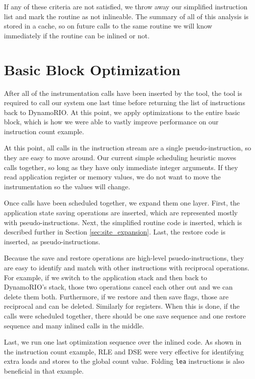 If any of these criteria are not satisfied, we throw away our simplified
instruction list and mark the routine as not inlineable.  The summary of all of
this analysis is stored in a cache, so on future calls to the same routine we
will know immediately if the routine can be inlined or not.

\section{Basic Block Optimization}

After all of the instrumentation calls have been inserted by the tool, the tool
is required to call our system one last time before returning the list of
instructions back to DynamoRIO.  At this point, we apply optimizations to the
entire basic block, which is how we were able to vastly improve performance on
our instruction count example.

At this point, all calls in the instruction stream are a single
pseudo-instruction, so they are easy to move around.  Our current simple
scheduling heuristic moves calls together, so long as they have only immediate
integer arguments.  If they read application register or memory values, we do
not want to move the instrumentation so the values will change.

Once calls have been scheduled together, we expand them one layer.  First, the
application state saving operations are inserted, which are represented mostly
with pseudo-instructions.  Next, the simplified routine code is inserted, which
is described further in Section \ref{sec:site_expansion}.  Last, the restore
code is inserted, as pseudo-instructions.

Because the save and restore operations are high-level psuedo-instructions, they
are easy to identify and match with other instructions with reciprocal
operations.  For example, if we switch to the application stack and then back to
DynamoRIO's stack, those two operations cancel each other out and we can delete
them both.  Furthermore, if we restore and then save flags, those are reciprocal
and can be deleted.  Similarly for registers.  When this is done, if the calls
were scheduled together, there should be one save sequence and one restore
sequence and many inlined calls in the middle.

Last, we run one last optimization sequence over the inlined code.  As shown in
the instruction count example, RLE and DSE were very effective for identifying
extra loads and stores to the global count value.  Folding {\tt lea}
instructions is also beneficial in that example.

